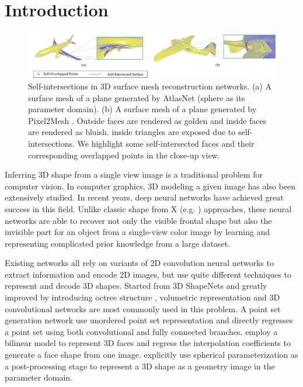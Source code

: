 \section{Introduction}
\begin{figure}[htbp]
	\centering
	\includegraphics[width=\linewidth]{img/issue/issue}
	\caption{Self-intersections in 3D surface mesh reconstruction networks. (a) A surface mesh of a plane generated by AtlasNet \cite{atlasnet} (sphere as its parameter domain). (b) A surface mesh of a plane generated by Pixel2Mesh \cite{pixel2mesh}. Outside faces are rendered as golden and inside faces are rendered as bluish.  inside triangles are exposed due to self-intersections. We highlight some self-intersected faces and their corresponding overlapped points in the close-up view.}
	\label{fig:issue}
\end{figure}
Inferring 3D shape from a single view image is a traditional problem for computer vision. In computer graphics, 3D modeling  a given image has also been extensively studied. In recent years, deep neural networks \cite{3DR2N2,PSGN,3Drender,imgrecon15,3dshapenet,endface,octreegen,surfnet,shapeprior} have achieved great success in this field. Unlike classic shape from X (e.g. \cite{shapefromshading,shapefromtext1,shapefromtext2}) approaches, these neural networks are able to recover not only the visible frontal shape but also the invisible part for an object from a single-view color image by learning and representing complicated prior knowledge from a large dataset.

Existing networks all rely on variants of 2D convolution neural networks to extract information and encode 2D images, but use quite different techniques to represent and decode 3D shapes. Started from 3D ShapeNets \cite{3dshapenet} and greatly improved by introducing octree structure \cite{octreegen}, volumetric representation and 3D convolutional networks are most commonly used in this problem. A point set generation network \cite{PSGN} use unordered point set representation and directly regresses a point set using both convolutional and fully connected branches. \cite{endface} employ a bilinear model to represent 3D faces and regress the interpolation coefficients to generate a face shape from one image. \cite{surfnet} explicitly use spherical parameterization as a post-processing stage to represent a 3D shape as a geometry image in the parameter domain. 

